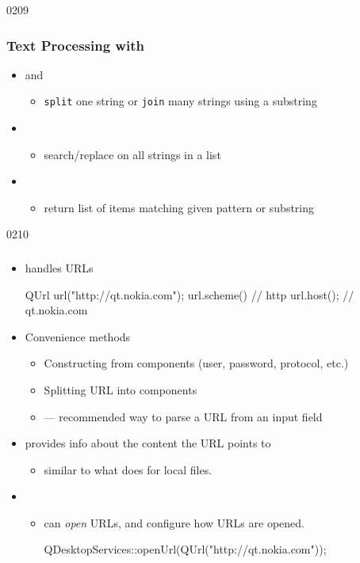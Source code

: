 \begin{slide}{0209}\frametitle{Text Processing with }
\begin{itemize}
\item {} and 
\begin{itemize}
  \item \texttt{split} one string or \texttt{join} many strings using a substring
\end{itemize} 
\item {} 
  \begin{itemize}
    \item search/replace on all strings in a list
  \end{itemize} 
  \item {} 
    \begin{itemize}
      \item return list of items matching given pattern or substring
    \end{itemize} 
\end{itemize}
\end{slide}

\begin{slide}[fragile]{0210}\frametitle{}
\begin{itemize}
\item {} handles URLs
\begin{cpp}
QUrl url("http://qt.nokia.com");
url.scheme()  // http
url.host();   // qt.nokia.com
\end{cpp}

\item Convenience methods 
\begin{itemize}
  \item Constructing from components (user, password, protocol, etc.)
  \item Splitting URL into components
  \item {} --- recommended way to parse a URL from an input field
\end{itemize}
\item {} provides info about the content the URL points to
  \begin{itemize}
  	\item similar to what  does for local files.
  \end{itemize}  
  \item {}
  \begin{itemize}  
  	\item can \emph{open} URLs, and configure how URLs are opened.
  	\begin{cpp}
QDesktopServices::openUrl(QUrl("http://qt.nokia.com"));
  	\end{cpp}
  \end{itemize}  
\end{itemize}
\end{slide}

